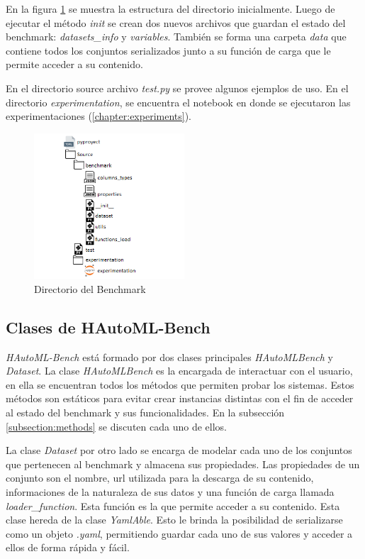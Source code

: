 En la figura \ref{fig:image1} se muestra la estructura del directorio inicialmente. Luego de ejecutar el método \textit{init} se crean dos nuevos archivos que 
guardan el estado del benchmark: \textit{datasets\_info} y \textit{variables}. También se forma una carpeta \textit{data} que contiene todos los conjuntos 
serializados junto a su función de carga que le permite acceder a su contenido.

En el directorio source archivo \textit{test.py} se provee algunos ejemplos de uso. En el directorio \textit{experimentation}, se encuentra el notebook en donde se 
ejecutaron las experimentaciones (\ref{chapter:experiments}).

\begin{figure}
    \centering
    \includegraphics[width=0.5\textwidth]{Graphics/directory.png}
    \caption{Directorio del Benchmark}
    \label{fig:image1}
 \end{figure}

\subsection{Clases de HAutoML-Bench}\label{subsection:class}

\textit{HAutoML-Bench} está formado por dos clases principales  \textit{HAutoMLBench} y \textit{Dataset}.
La clase \textit{HAutoMLBench} es la encargada de interactuar con el usuario, en ella se encuentran todos los 
métodos que permiten probar los sistemas. Estos métodos son estáticos para evitar crear instancias distintas con el fin de acceder
al estado del benchmark y sus funcionalidades. En la subsección \ref{subsection:methods} se discuten cada uno de ellos. 

La clase \textit{Dataset} por otro lado se encarga de modelar cada uno de los conjuntos que pertenecen al benchmark y 
almacena sus propiedades. Las propiedades de un conjunto son el nombre, url utilizada para la descarga de su 
contenido, informaciones de la naturaleza de sus datos y una función de carga llamada 
\textit{loader\_function}. Esta función es la que permite acceder a su contenido. 
Esta clase hereda de la clase \textit{YamlAble}. Esto le brinda la posibilidad  de serializarse como un objeto \textit{.yaml}, 
permitiendo guardar cada uno de sus valores y acceder a ellos de forma rápida y fácil. 

